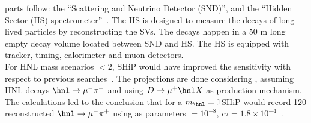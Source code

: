 parts follow: the ``Scattering and Neutrino
Detector (SND)'', and the ``Hidden Sector (HS)
spectrometer''~\cite{CERN-SHiP-NOTE-2018-001}. The HS is designed to
measure the decays of long-lived particles by reconstructing the
SVs. The decays happen in a 50 m long empty decay volume located
between SND and HS. The HS is equipped with 
tracker, timing, calorimeter and muon detectors. \\
For HNL mass scenarios $<2$\GeV, SHiP would have improved the sensitivity
with respect to previous searches~\cite{bonivento2013proposal}.
The projections are done considering \mixparm, assuming HNL decays $\hnl
\rightarrow \mu^{-} \pi^{+}$ and using $D
\rightarrow \mu^{+} \hnl X$ as production mechanism. The calculations
led to the conclusion that for a $m_\hnl = 1$\GeV SHiP would record
120 reconstructed $\hnl
\rightarrow \mu^{-} \pi^{+}$ using as parameters \mixparm $= 10^{-8}$,
$c\tau = 1.8 \times 10^{-4}$~\cite{bonivento2013proposal}. \\

